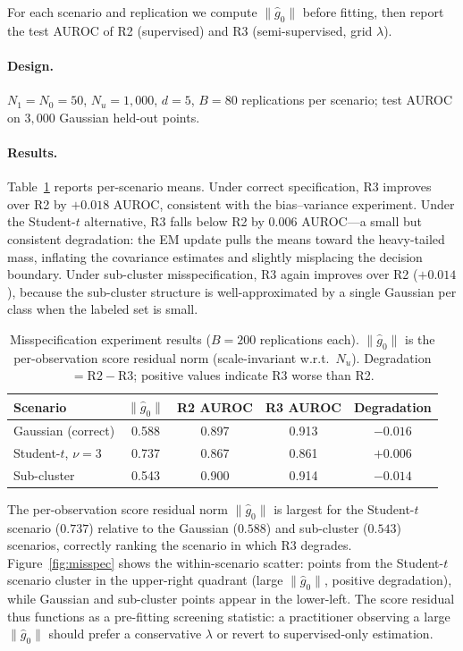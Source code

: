 \documentclass[11pt]{article}
\theoremstyle{definition}
\newcommand{\lam}{\lambda}
\begin{document}
For each scenario and replication we compute \(\|\hat g_0\|\) before fitting,
then report the test AUROC of R2 (supervised) and R3 (semi-supervised, grid \(\lam\)).

\paragraph{Design.}
\(N_1=N_0=50\), \(N_u=1{,}000\), \(d=5\), \(B=80\) replications per scenario;
test AUROC on \(3{,}000\) Gaussian held-out points.

\paragraph{Results.}
Table~\ref{tab:misspec} reports per-scenario means.
Under correct specification, R3 improves over R2 by \(+0.018\) AUROC,
consistent with the bias--variance experiment.
Under the Student-\(t\) alternative, R3 falls below R2 by \(0.006\)
AUROC—a small but consistent degradation: the EM update pulls the means
toward the heavy-tailed mass, inflating the covariance estimates and
slightly misplacing the decision boundary.
Under sub-cluster misspecification, R3 again improves over R2 (\(+0.014\)),
because the sub-cluster structure is well-approximated by a single
Gaussian per class when the labeled set is small.

\begin{table}[t]
\centering
\caption{Misspecification experiment results (\(B=200\) replications each).
\(\|\hat g_0\|\) is the per-observation score residual norm (scale-invariant w.r.t.\ \(N_u\)).
Degradation \(= \text{R2} - \text{R3}\);
positive values indicate R3 worse than R2.}
\label{tab:misspec}
\begin{tabular}{lcccc}
\toprule
Scenario & \(\|\hat g_0\|\) & R2 AUROC & R3 AUROC & Degradation \\
\midrule
Gaussian (correct)       & 0.588 & 0.897 & 0.913 & \(-0.016\) \\
Student-\(t\), \(\nu=3\) & 0.737 & 0.867 & 0.861 & \(+0.006\) \\
Sub-cluster              & 0.543 & 0.900 & 0.914 & \(-0.014\) \\
\bottomrule
\end{tabular}
\end{table}

The per-observation score residual norm \(\|\hat g_0\|\) is largest for the
Student-\(t\) scenario (\(0.737\)) relative to the Gaussian
(\(0.588\)) and sub-cluster (\(0.543\)) scenarios, correctly
ranking the scenario in which R3 degrades.
Figure~\ref{fig:misspec} shows the within-scenario scatter:
points from the Student-\(t\) scenario cluster in the upper-right
quadrant (large \(\|\hat g_0\|\), positive degradation), while
Gaussian and sub-cluster points appear in the lower-left.
The score residual thus functions as a pre-fitting screening
statistic: a practitioner observing a large \(\|\hat g_0\|\) should
prefer a conservative \(\lam\) or revert to supervised-only estimation.
\end{document}
